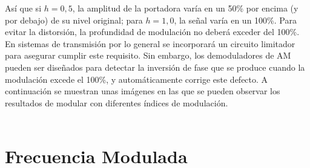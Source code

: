 \documentclass[a4paper]{article}
\begin{document}
Así que si $h=0,5$, la amplitud de la portadora varía en un 50\% por encima (y por debajo) de su nivel original; para $h=1,0$, la señal varía en un 100\%. Para evitar la distorsión, la profundidad de modulación no deberá exceder del 100\%. En sistemas de transmisión por lo general se incorporará un circuito limitador para asegurar cumplir este requisito. Sin embargo, los demoduladores de AM pueden ser diseñados para detectar la inversión de fase que se produce cuando la modulación excede el 100\%, y automáticamente corrige este defecto. A continuación se muestran unas imágenes en las que se pueden observar los resultados de modular con diferentes índices de modulación.
\\
\\
\noindent{}

\section{Frecuencia Modulada}
\end{document}
